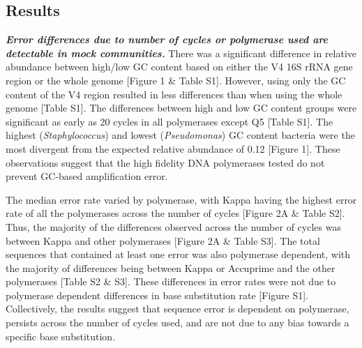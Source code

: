 \documentclass[11pt,]{article}
\begin{document}
\newpage

\subsection{Results}\label{results}

\textbf{\emph{Error differences due to number of cycles or polymerase
used are detectable in mock communities.}} There was a significant
difference in relative abundance between high/low GC content based on
either the V4 16S rRNA gene region or the whole genome {[}Figure 1 \&
Table S1{]}. However, using only the GC content of the V4 region
resulted in less differences than when using the whole genome {[}Table
S1{]}. The differences between high and low GC content groups were
significant as early as 20 cycles in all polymerases except Q5 {[}Table
S1{]}. The highest (\emph{Staphylococcus}) and lowest
(\emph{Pseudomonas}) GC content bacteria were the most divergent from
the expected relative abundance of 0.12 {[}Figure 1{]}. These
observations suggest that the high fidelity DNA polymerases tested do
not prevent GC-based amplification error.

The median error rate varied by polymerase, with Kappa having the
highest error rate of all the polymerases across the number of cycles
{[}Figure 2A \& Table S2{]}. Thus, the majority of the differences
observed across the number of cycles was between Kappa and other
polymerases {[}Figure 2A \& Table S3{]}. The total sequences that
contained at least one error was also polymerase dependent, with the
majority of differences being between Kappa or Accuprime and the other
polymerases {[}Table S2 \& S3{]}. These differences in error rates were
not due to polymerase dependent differences in base substitution rate
{[}Figure S1{]}. Collectively, the results suggest that sequence error
is dependent on polymerase, persists across the number of cycles used,
and are not due to any bias towards a specific base substitution.
\end{document}

